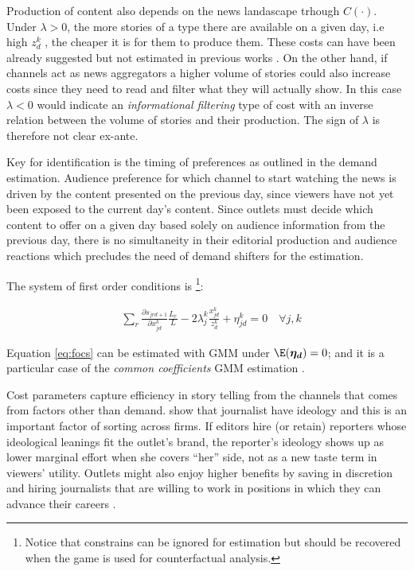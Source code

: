 \documentclass[12pt]{article}
\begin{document}
	
Production of content also depends on the news landascape trhough  $C(\cdot)$. Under $\lambda >0$, the more stories of a type there are available on a given day, i.e high $z_d^k $ , the cheaper it is for them to produce them. These costs can have been already suggested but not estimated in previous works \citep{SimonovRao2022}.  On the other hand, if channels act as news aggregators a higher volume of stories could also increase costs since they need to read and filter what they will actually show. In this case $\lambda<0$ would indicate an \textit{informational filtering} type of cost with an inverse relation between the volume of stories and their production. The sign of $\lambda$ is therefore not clear ex-ante. 

Key for identification is the timing of preferences as outlined in the demand estimation. Audience preference for which channel to start watching the news is driven by the content presented on the previous day, since viewers have not yet been exposed to the current day’s content. Since outlets must decide which content to offer on a given day based solely on audience information from the previous day, there is no simultaneity in their editorial production and audience reactions which precludes the need of demand shifters for the estimation. 


	
	The system of first order conditions is \footnote{Notice that constrains can be ignored for estimation but should be recovered when the game is used for counterfactual analysis. }:
	
		\begin{equation}
		\begin{aligned}
			&   \sum_r\frac{\partial s_{jrd+1}}{\partial x_{jd}^k}\frac{L_r}{L}  -2\lambda_j^k \frac{x_{jd}^k}{z_d^k}  +\eta^k_{jd} =0 \quad \forall j,k 
		\end{aligned}
		\label{eq:focs}
	\end{equation} 
	

	Equation \ref{eq:focs} can be estimated with GMM under $\E(\bm{\eta_d})=0$; and it is a particular case of the \textit{common coefficients} GMM estimation \citep{hayashi2000econometrics}. 
	
	  Cost parameters capture efficiency in story telling from the channels that comes from factors other than demand. \cite{boxell2022journalist} show that journalist have ideology and this is an important factor of sorting across firms. If editors hire (or retain) reporters whose ideological leanings fit the outlet’s brand, the reporter’s ideology shows up as lower marginal effort when she covers “her” side, not as a new taste term in viewers’ utility. Outlets might also enjoy higher benefits by saving in discretion and hiring journalists that are willing to work in positions in which they can advance their careers \citep{baron2006persistent}.
	  
\end{document}

